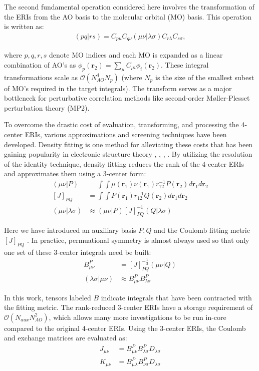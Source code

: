 The second fundamental operation considered here involves the transformation of the ERIs from the AO basis 
to the molecular orbital (MO) basis. This operation is written as:
\begin{align}
(pq | rs) = C_{p \mu}C_{q \nu}
(\mu \nu | \lambda \sigma)C_{r\lambda}C_{s\sigma},
\end{align} 

\noindent where $p,q,r,s$ denote MO indices and each MO is expanded as a linear combination of AO's as 
$\phi_p(\textbf{r}_{2})=\sum_\mu C_{\mu i} \phi_i(\textbf{r}_{2})$.
These integral transformations scale 
as $\mathcal{O}(N_{AO}^4N_p)$ (where $N_p$ is the size of the smallest subest of MO's required in the target integrals). 
The transform serves as a major 
bottleneck for perturbative correlation methods like second-order M{\o}ller-Plesset perturbation theory (MP2).

To overcome the drastic cost of evaluation, transforming, and processing the 4-center ERIs, various approximations 
and screening techniques have been developed. 
Density fitting is one method for alleviating these costs that has been gaining popularity in electronic structure theory 
\cite{Sherrill:2010:110902}, \cite{Whitten:1973:4496}, \cite{Dunlap:1979:3396}, \cite{Dunlap:1979:3396}.
By utilizing the resolution of the identity technique, 
density fitting reduces the rank of the 4-center ERIs and approximates them using a 3-center form: 
\begin{align} 
(\mu \nu|P) &= \int \int \mu(\textbf{r}_{1}) 
\nu(\textbf{r}_{1}) r^{-1}_{12} P(\textbf{r}_{2}) d\textbf{r}_{1} d\textbf{r}_{2} \\
[J]_{PQ} &= \int \int P(\textbf{r}_1)r_{12}^{-1}Q(\textbf{r}_2) d{\textbf{r}_{1}}d{\textbf{r}_{2}} \\
(\mu \nu|\lambda \sigma) &\approx (\mu \nu| P)[J]_{PQ}^{-1}(Q|\lambda \sigma)  
\end{align} 

\noindent Here we have introduced an auxiliary basis $P, Q$ and the Coulomb fitting metric $[J]_{PQ}$ \cite{ref2}. 
In practice, permuational symmetry is almost always used so that only one set of these 3-center integrals need be built:
\begin{align} 
B_{\mu \nu}^P &= [J]_{PQ}^{-\frac{1}{2}}(\mu \nu | Q)  \\ 
(\lambda \sigma | \mu \nu) &\approx  B_{\mu \nu}^P B_{\lambda \sigma}^P  \end{align} 

\noindent In this work, tensors labeled $B$ indicate integrals that have been contracted with the fitting metric.
The rank-reduced 3-center ERIs have a storage requirement of $\mathcal{O}(N_{aux}N_{AO}^2)$, 
which allows many more investigations to be run in-core compared to the original 4-center ERIs. 
Using the 3-center ERIs, the Coulomb and exchange matrices are evaluated as: 
\begin{align}
J_{\mu \nu} &= B_{\mu \nu}^P B_{\lambda \sigma}^PD_{\lambda \sigma} \\
K_{\mu \nu} &= B_{\mu \lambda}^P B_{\nu \sigma}^PD_{\lambda \sigma}
\end{align}


